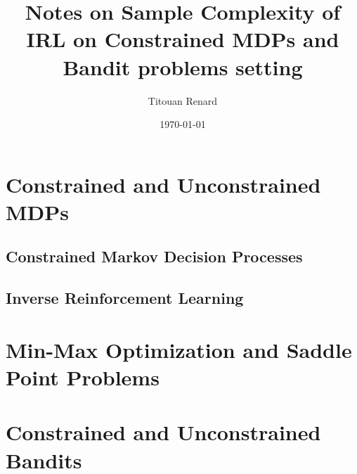 \documentclass[11pt]{article}
\title{Notes on Sample Complexity of IRL on Constrained MDPs and Bandit problems setting}
\date{\today}
\author{Titouan Renard}
\begin{document}
\maketitle	

\tableofcontents

\section{Constrained and Unconstrained MDPs}


\newpage
\subsection{Constrained Markov Decision Processes} \label{sec:cmdps}


\newpage
\subsection{Inverse Reinforcement Learning} \label{sec:irl}


\newpage
\section{Min-Max Optimization and Saddle Point Problems}


\newpage
\section{Constrained and Unconstrained Bandits}



\newpage
\printbibliography
\end{document}
